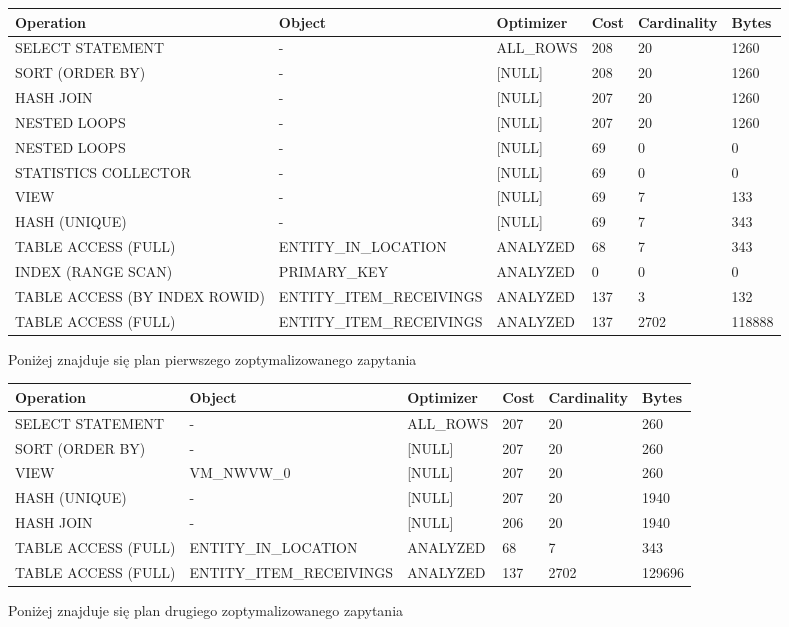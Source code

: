 \documentclass[11pt]{article}
\numberwithin{figure}{subsection}
\begin{document}
		\begin{tabularx}{\textwidth}{|X|X|X|X|X|X|}
Operation&Object&Optimizer&Cost&Cardinality&Bytes\\ \hline
SELECT STATEMENT& - &ALL\_ROWS&208&20&1260\\ \hline
SORT (ORDER BY)& - &[NULL]&208&20&1260\\ \hline
HASH JOIN& - &[NULL]&207&20&1260\\ \hline
NESTED LOOPS& - &[NULL]&207&20&1260\\ \hline
NESTED LOOPS& - &[NULL]&69&0&0\\ \hline
STATISTICS COLLECTOR& - &[NULL]&69&0&0\\ \hline
VIEW& - &[NULL]&69&7&133\\ \hline
HASH (UNIQUE)& - &[NULL]&69&7&343\\ \hline
TABLE ACCESS (FULL)&ENTITY\_IN\_LOCATION&ANALYZED&68&7&343\\ \hline
INDEX (RANGE SCAN)&PRIMARY\_KEY&ANALYZED&0&0&0\\ \hline
TABLE ACCESS (BY INDEX ROWID)&ENTITY\_ITEM\_RECEIVINGS&ANALYZED&137&3&132\\ \hline
TABLE ACCESS (FULL)&ENTITY\_ITEM\_RECEIVINGS&ANALYZED&137&2702&118888\\ \hline
		\end{tabularx}
		
		Poniżej znajduje się plan pierwszego zoptymalizowanego zapytania \\
		
		\begin{tabularx}{\textwidth}{|X|X|X|X|X|X|}
Operation&Object&Optimizer&Cost&Cardinality&Bytes\\ \hline
SELECT STATEMENT& - &ALL\_ROWS&207&20&260\\ \hline
SORT (ORDER BY)& - &[NULL]&207&20&260\\ \hline
VIEW&VM\_NWVW\_0&[NULL]&207&20&260\\ \hline
HASH (UNIQUE)& - &[NULL]&207&20&1940\\ \hline
HASH JOIN& - &[NULL]&206&20&1940\\ \hline
TABLE ACCESS (FULL)&ENTITY\_IN\_LOCATION&ANALYZED&68&7&343\\ \hline
TABLE ACCESS (FULL)&ENTITY\_ITEM\_RECEIVINGS&ANALYZED&137&2702&129696\\ \hline
		\end{tabularx}
		
		Poniżej znajduje się plan drugiego zoptymalizowanego zapytania \\
		
\end{document}
